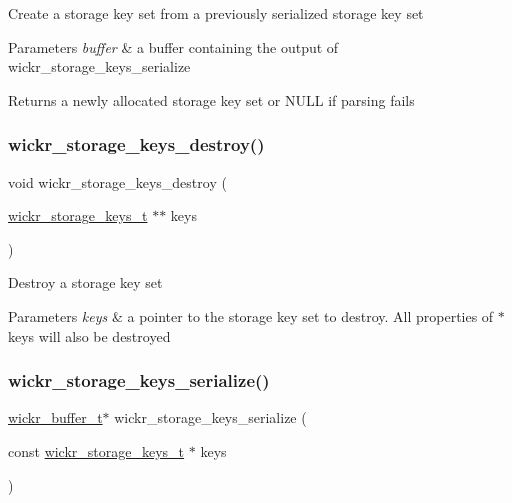 Create a storage key set from a previously serialized storage key set


\begin{DoxyParams}{Parameters}
{\em buffer} & a buffer containing the output of \textquotesingle{}wickr\+\_\+storage\+\_\+keys\+\_\+serialize\textquotesingle{} \\
\hline
\end{DoxyParams}
\begin{DoxyReturn}{Returns}
a newly allocated storage key set or N\+U\+LL if parsing fails 
\end{DoxyReturn}
\mbox{\label{group__wickr__storage__keys_ga2c1494802577d025d70bf553c43da344}} 
\subsubsection{\texorpdfstring{wickr\+\_\+storage\+\_\+keys\+\_\+destroy()}{wickr\_storage\_keys\_destroy()}}
{\footnotesize\ttfamily void wickr\+\_\+storage\+\_\+keys\+\_\+destroy (\begin{DoxyParamCaption}\item[{\mbox{\hyperlink{structwickr__storage__keys}{wickr\+\_\+storage\+\_\+keys\+\_\+t}} $\ast$$\ast$}]{keys }\end{DoxyParamCaption})}

Destroy a storage key set


\begin{DoxyParams}{Parameters}
{\em keys} & a pointer to the storage key set to destroy. All properties of \textquotesingle{}$\ast$keys\textquotesingle{} will also be destroyed \\
\hline
\end{DoxyParams}
\mbox{\label{group__wickr__storage__keys_ga10a0d6e13442682b2fecff2ed753c2f6}} 
\subsubsection{\texorpdfstring{wickr\+\_\+storage\+\_\+keys\+\_\+serialize()}{wickr\_storage\_keys\_serialize()}}
{\footnotesize\ttfamily \mbox{\hyperlink{structwickr__buffer}{wickr\+\_\+buffer\+\_\+t}}$\ast$ wickr\+\_\+storage\+\_\+keys\+\_\+serialize (\begin{DoxyParamCaption}\item[{const \mbox{\hyperlink{structwickr__storage__keys}{wickr\+\_\+storage\+\_\+keys\+\_\+t}} $\ast$}]{keys }\end{DoxyParamCaption})}

